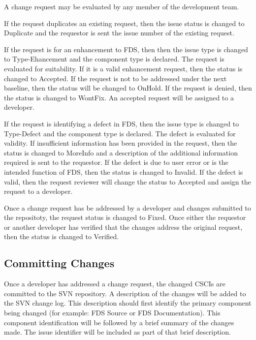 \documentclass[11pt]{book}
\begin{document}
A change request may be evaluated by any member of the development team. 

If the request duplicates an existing request, then the issue status is changed to {\ct Duplicate} and the 
requestor is sent the issue number of the existing request.

If the request is for an enhancement to FDS, then then the issue type is changed to {\ct Type-Ehancement} and the
component type is declared. The request is evaluated for suitability.  If it is a valid enhancement 
request, then the status is changed to {\ct Accepted}.  If the request is not to
be addressed under the next baseline, then the status will be changed to {\ct OnHold}.  If the request is denied, then
the status is changed to {\ct WontFix}.  An accepted request will be assigned to a developer.

If the request is identifying a defect in FDS, then the issue type is changed to {\ct Type-Defect} and the
component type is declared.  The defect is evaluated for validity.  If insufficient information has
been provided in the request, then the status is changed to {\ct MoreInfo} and a description of the additional 
information required is sent to the requestor.  If the defect is due to user error or is the intended function of FDS,
then the status is changed to {\ct Invalid}.  If the defect is valid, then the request reviewer will change the 
status to {\ct Accepted} and assign the request to a developer.

Once a change request has be addressed by a developer and changes submitted to the repositoty, the request status
is changed to {\ct Fixed}.  Once either the requestor or another developer has verified that the changes address 
the original request, then the status is changed to {\ct Verified}.  


\subsection{Committing Changes}

Once a developer has addressed a change request, the changed CSCIs are committed to the SVN repository.  A description
of the changes will be added to the SVN change log.  This description should first identify the primary component being 
changed (for example: FDS Source or FDS Documentation).  This component identification will be followed by a brief 
summary of the changes made.  The issue identifier will be included as part of that brief description.
\end{document}
